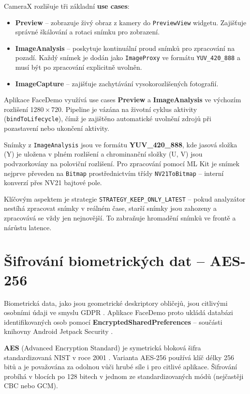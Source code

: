 \documentclass[FM,BP,CZ]{tulthesis}
\begin{document}
CameraX rozlišuje tři základní \textbf{use cases}:
\begin{itemize}
    \item \textbf{Preview} – zobrazuje živý obraz z kamery do \texttt{PreviewView} widgetu. Zajišťuje správné škálování a rotaci snímku pro zobrazení.
    \item \textbf{ImageAnalysis} – poskytuje kontinuální proud snímků pro zpracování na pozadí. Každý snímek je dodán jako \texttt{ImageProxy} ve formátu \texttt{YUV\_420\_888} a musí být po zpracování explicitně uvolněn.
    \item \textbf{ImageCapture} – zajišťuje zachytávání vysokorozlišených fotografií.
\end{itemize}

Aplikace FaceDemo využívá use cases \textbf{Preview} a \textbf{ImageAnalysis} ve výchozím rozlišení 1280\,×\,720. Pipeline je vázána na životní cyklus aktivity (\texttt{bindToLifecycle}), čímž je zajištěno automatické uvolnění zdrojů při pozastavení nebo ukončení aktivity.

Snímky z \texttt{ImageAnalysis} jsou ve formátu \textbf{YUV\_420\_888}, kde jasová složka (Y) je uložena v plném rozlišení a chrominanční složky (U, V) jsou podvzorkovány na poloviční rozlišení. Pro zpracování pomocí ML Kit je snímek nejprve převeden na \texttt{Bitmap} prostřednictvím třídy \texttt{NV21ToBitmap} – interní konverzí přes NV21 bajtové pole.

Klíčovým aspektem je strategie \texttt{STRATEGY\_KEEP\_ONLY\_LATEST} – pokud analyzátor nestíhá zpracovat snímky v reálném čase, starší snímky jsou zahozeny a zpracovává se vždy jen nejnovější. To zabraňuje hromadění snímků ve frontě a nárůstu latence.

\section{Šifrování biometrických dat – AES-256}
Biometrická data, jako jsou geometrické deskriptory obličejů, jsou citlivými osobními údaji ve smyslu GDPR \cite{gdpr2016}. Aplikace FaceDemo proto ukládá databázi identifikovaných osob pomocí \textbf{EncryptedSharedPreferences} – součásti knihovny Android Jetpack Security \cite{androidkeystore2024}.

\textbf{AES} (Advanced Encryption Standard) je symetrická bloková šifra standardizovaná NIST v roce 2001 \cite{nist2001aes}. Varianta AES-256 používá klíč délky 256 bitů a je považována za odolnou vůči hrubé síle i pro citlivé aplikace. Šifrování probíhá v blocích po 128 bitech v jednom ze standardizovaných módů (nejčastěji CBC nebo GCM).
\end{document}
